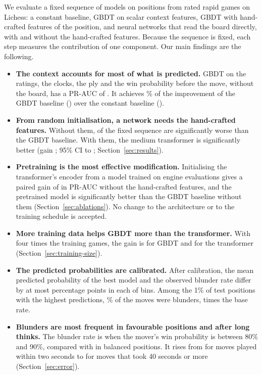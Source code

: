 \documentclass[11pt]{article}
\begin{document}
We evaluate a fixed sequence of models on  positions from rated
rapid games on Lichess: a constant baseline, GBDT on scalar context features,
GBDT with hand-crafted features of the position, and neural networks that
read the board directly, with and without the hand-crafted features. Because
the sequence is fixed, each step measures the contribution of one component.
Our main findings are the following.
\begin{itemize}
\item \textbf{The context accounts for most of what is predicted.} GBDT on
the ratings, the clocks, the ply and the win probability before the move,
without the board, has a PR-AUC of . It achieves
\% of the improvement of the GBDT baseline
() over the constant baseline ().
\item \textbf{From random initialisation, a network needs the hand-crafted
features.} Without them,  of the fixed sequence are
significantly worse than the GBDT baseline. With them, the medium transformer
is significantly better (gain ; 95\% CI
 to
; Section~\ref{sec:results}).
\ifchangestart
\item \textbf{Pretraining is the most effective modification.} Initialising
the transformer's encoder from a model trained on engine evaluations gives a
paired gain of 
in PR-AUC without the hand-crafted features, and the pretrained model is
significantly better than the GBDT baseline without them
(Section~\ref{sec:ablations}).\ifshapes{} No change to the architecture or to
the training schedule is accepted.\fi
\fi
\ifmore
\item \textbf{More training data helps GBDT more than the transformer.} With
four times the training games, the gain is
 for GBDT and
 for
the transformer (Section~\ref{sec:training-size}).
\fi
\item \textbf{The predicted probabilities are calibrated.} After calibration,
the mean predicted probability of the best model and the observed blunder
rate differ by at most  percentage points in
each of  bins\iflook. Among the 1\% of test
positions with the highest predictions, \% of the moves
were blunders,  times the base rate\fi.
\iflook
\item \textbf{Blunders are most frequent in favourable positions and after
long thinks.} The blunder rate is  when the
mover's win probability is between 80\% and 90\%, compared with
 in balanced positions. It rises from
 for moves played within two seconds to
 for moves that took 40 seconds or more
(Section~\ref{sec:error}).
\fi
\end{itemize}
\end{document}
